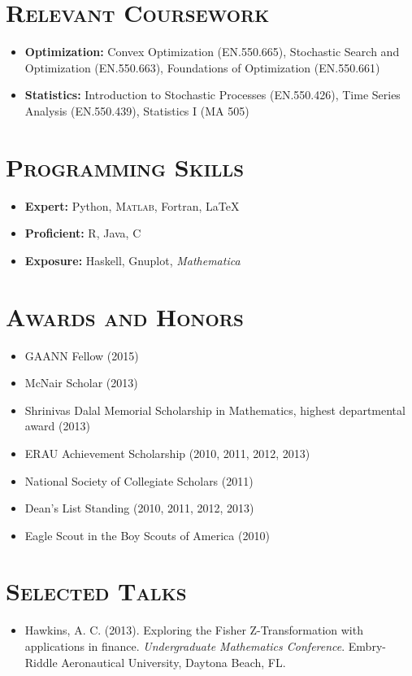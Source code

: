\documentclass[10pt]{article}
\begin{document}
\section*{\textsc{Relevant Coursework}}
\begin{itemize}
    \item[] \textbf{Optimization:} Convex Optimization (EN.550.665), Stochastic Search and Optimization (EN.550.663), Foundations of Optimization (EN.550.661)
    \item[] \textbf{Statistics:} Introduction to Stochastic Processes (EN.550.426), Time Series Analysis (EN.550.439), Statistics I (MA 505)
\end{itemize}

\section*{\textsc{Programming Skills}}
\begin{itemize}
    \item[] \textbf{Expert:} Python, \textsc{Matlab}, Fortran, \LaTeX{}
    \item[] \textbf{Proficient:} \textsc{R}, Java, \textsc{C}
    \item[] \textbf{Exposure:} Haskell, Gnuplot, \textit{Mathematica}
\end{itemize}

\section*{\textsc{Awards and Honors}}
\begin{itemize}
    \item GAANN Fellow (2015)
    \item McNair Scholar (2013)
    \item Shrinivas Dalal Memorial Scholarship in Mathematics, highest departmental award (2013)
    \item ERAU Achievement Scholarship (2010, 2011, 2012, 2013)
    \item National Society of Collegiate Scholars (2011)
    \item Dean's List Standing (2010, 2011, 2012, 2013)
    \item Eagle Scout in the Boy Scouts of America (2010)
\end{itemize}

\section*{\textsc{Selected Talks}}
\begin{itemize}[leftmargin=*]
    \item[] Hawkins, A. C. (2013). Exploring the Fisher Z-Transformation with applications in finance. \textit{Undergraduate Mathematics Conference}. Embry-Riddle Aeronautical University, Daytona Beach, FL.
\end{itemize}
\end{document}
